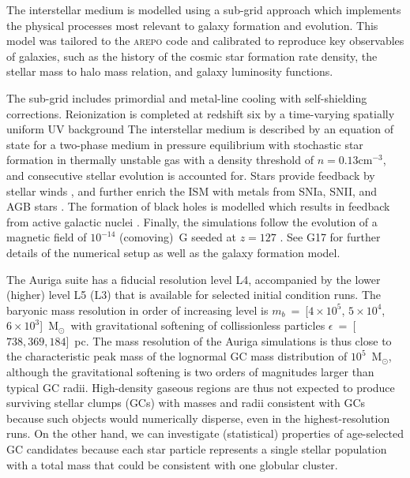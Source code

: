 \documentclass[a4paper,fleqn,usenatbib]{mnras}
\newcommand{\Sun}[0]{\ensuremath{_{\odot}}}
\begin{document}
The interstellar medium is modelled using a sub-grid approach which implements
the physical processes most relevant to galaxy formation and evolution.
This model was tailored to the \textsc{arepo} code and calibrated to reproduce
key observables of galaxies, such as the history of the cosmic star formation rate
density, the stellar mass to halo mass relation, and galaxy luminosity functions.

The sub-grid includes primordial and metal-line cooling with self-shielding
corrections. Reionization is completed at redshift six by a time-varying
spatially uniform UV background \citep{2009ApJ...703.1416F, 2013MNRAS.436.3031V}
The interstellar medium is described by an equation of state for a two-phase medium
in pressure equilibrium \citep{2003MNRAS.339..289S} with stochastic star formation
in thermally unstable gas with a density threshold of $n = 0.13 \text{cm}^{-3}$,
and consecutive stellar evolution is accounted for. Stars provide feedback by
stellar winds \citep{2014MNRAS.437.1750M, 2017MNRAS.467..179G}, and further
enrich the ISM with metals from SNIa, SNII, and AGB stars \citep{2013MNRAS.436.3031V}.
The formation of black holes is modelled which results in feedback from active
galactic nuclei \citep{2005MNRAS.361..776S, 2014MNRAS.437.1750M, 2017MNRAS.467..179G}.
Finally, the simulations follow the evolution of a magnetic field of $10^{-14}$
(comoving)~G seeded at $z = 127$ \citep{2013MNRAS.432..176P, 2014ApJ...783L..20P}.
See G17 for further details of the numerical setup as well as the galaxy formation
model.

The Auriga suite has a fiducial resolution level L4, accompanied by the lower
(higher) level L5 (L3) that is available for selected initial condition runs.
The baryonic mass resolution in order of increasing level is $m_b$~=~[$4 \times 10^5$,
$5 \times 10^4$, $6 \times 10^3$]~M\Sun \, with gravitational softening of
collissionless particles $\epsilon$~=~[$738, 369, 184$]~pc. The mass resolution
of the Auriga simulations is thus close to the characteristic peak mass of the
lognormal GC mass distribution of $10^{5}$~M\Sun \citep{1991ARA&A..29..543H}, 
although the gravitational softening is two orders of magnitudes larger than
typical GC radii. High-density gaseous regions are thus not expected to produce
surviving stellar clumps (GCs) with masses and radii consistent with GCs because
such objects would numerically disperse, even in the highest-resolution runs.
On the other hand, we can investigate (statistical) properties of age-selected 
GC candidates because each star particle represents a single stellar population
with a total mass that could be consistent with one globular cluster.
\end{document}
